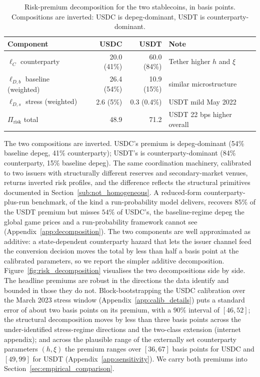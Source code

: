 \begin{table}[H]
\centering
\caption{Risk-premium decomposition for the two stablecoins, in basis points. Compositions are inverted: USDC is depeg-dominant, USDT is counterparty-dominant.}\label{tab:dual_asset_premium}
\begin{tabular}{lrrl}
\toprule
Component & USDC & USDT & Note \\
\midrule
$\ell_C$ counterparty                 & 20.0 (41\%) & 60.0 (84\%) & Tether higher $h$ and $\xi$ \\
$\ell_{D,b}$ baseline (weighted)      & 26.4 (54\%) & 10.9 (15\%) & similar microstructure \\
$\ell_{D,s}$ stress (weighted)        & 2.6  (5\%)  & 0.3 (0.4\%) & USDT mild May 2022 \\
$\Pi_{\text{risk}}$ total             & 48.9        & 71.2        & USDT 22 bps higher overall \\
\bottomrule
\end{tabular}
\end{table}

The two compositions are inverted. USDC's premium is depeg-dominant (54\% baseline depeg, 41\% counterparty); USDT's is counterparty-dominant (84\% counterparty, 15\% baseline depeg). The same coordination machinery, calibrated to two issuers with structurally different reserves and secondary-market venues, returns inverted risk profiles, and the difference reflects the structural primitives documented in Section~\ref{sub:not_homogeneous}. A reduced-form counterparty-plus-run benchmark, of the kind a run-probability model delivers, recovers $85\%$ of the USDT premium but misses $54\%$ of USDC's, the baseline-regime depeg the global game prices and a run-probability framework cannot see (Appendix~\ref{app:decomposition}). The two components are well approximated as additive: a state-dependent counterparty hazard that lets the issuer channel feed the conversion decision moves the total by less than half a basis point at the calibrated parameters, so we report the simpler additive decomposition. Figure~\ref{fig:risk_decomposition} visualises the two decompositions side by side. The headline premiums are robust in the directions the data identify and bounded in those they do not. Block-bootstrapping the USDC calibration over the March 2023 stress window (Appendix~\ref{app:calib_details}) puts a standard error of about two basis points on its premium, with a $90\%$ interval of $[46,52]$; the structural decomposition moves by less than three basis points across the under-identified stress-regime directions and the two-class extension (internet appendix); and across the plausible range of the externally set counterparty parameters $(h,\xi)$ the premium ranges over $[36,67]$ basis points for USDC and $[49,99]$ for USDT (Appendix~\ref{app:sensitivity}). We carry both premiums into Section~\ref{sec:empirical_comparison}.

